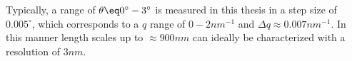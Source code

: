 \documentclass[\main/dresen_thesis.tex]{subfiles}
\begin{document}
    Typically, a range of $\theta \eq 0^\circ - 3^\circ$ is measured in this thesis in a step size of $0.005^\circ$, which corresponds to a $q$ range of $0 - 2 \unit{nm^{-1}}$ and $\Delta q \approx 0.007 \unit{nm^{-1}}$.
    In this manner length scales up to $\approx 900 \unit{nm}$ can ideally be characterized with a resolution of $3 \unit{nm}$.
\end{document}
